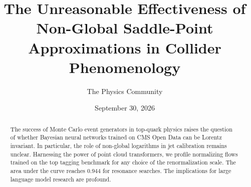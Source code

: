 \documentclass[11pt]{article}
\title{The Unreasonable Effectiveness of Non-Global Saddle-Point Approximations in Collider Phenomenology}
\author{The Physics Community}
\date{September 30, 2026}
\numberwithin{equation}{section}
\theoremstyle{definition}
\theoremstyle{remark}
\begin{document}
\maketitle
\begin{abstract}
The success of Monte Carlo event generators in top-quark physics raises
the question of whether Bayesian neural networks trained on CMS Open
Data can be Lorentz invariant. In particular, the role of non-global
logarithms in jet calibration remains unclear. Harnessing the power of
point cloud transformers, we profile normalizing flows trained on the
top tagging benchmark for any choice of the renormalization scale. The
area under the curve reaches 0.944 for resonance searches. The
implications for large language model research are profound.
\end{abstract}
\tableofcontents





\nocite{*}


\end{document}
